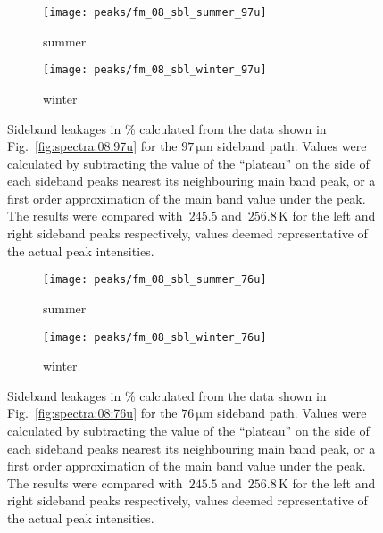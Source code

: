 \begin{figure}[ht]
    \centering
    \begin{subfigure}[b]{0.9545\textwidth}
        \texttt{[image: peaks/fm\_08\_sbl\_summer\_97u]}
        \caption{summer}\label{fig:sbl:08:summer:97u}
    \end{subfigure}
    \begin{subfigure}[b]{0.9545\textwidth}
        \texttt{[image: peaks/fm\_08\_sbl\_winter\_97u]}
        \caption{winter}\label{fig:sbl:08:winter:97u}
    \end{subfigure}
    \caption{Sideband leakages in \% calculated from the data shown in
        Fig.~\ref{fig:spectra:08:97u} for the $97\,\mathrm{\mu m}$ sideband
        path.  Values were calculated by subtracting the value of the
        ``plateau'' on the side of each sideband peaks nearest its
        neighbouring main band peak, or a first order approximation of the
        main band value under the peak.  The results were compared with~$245.5$
        and~$256.8\,\mathrm{K}$ for the left and right sideband peaks
        respectively, values deemed representative of the actual peak
        intensities.
        }\label{fig:sbl:08:97u}
\end{figure}

\begin{figure}[ht]
    \centering
    \begin{subfigure}[b]{0.9545\textwidth}
        \texttt{[image: peaks/fm\_08\_sbl\_summer\_76u]}
        \caption{summer}\label{fig:sbl:08:summer:76u}
    \end{subfigure}
    \begin{subfigure}[b]{0.9545\textwidth}
        \texttt{[image: peaks/fm\_08\_sbl\_winter\_76u]}
        \caption{winter}\label{fig:sbl:08:winter:76u}
    \end{subfigure}
    \caption{Sideband leakages in \% calculated from the data shown in
        Fig.~\ref{fig:spectra:08:76u} for the $76\,\mathrm{\mu m}$ sideband
        path.  Values were calculated by subtracting the value of the
        ``plateau'' on the side of each sideband peaks nearest its
        neighbouring main band peak, or a first order approximation of the
        main band value under the peak.  The results were compared with~$245.5$
        and~$256.8\,\mathrm{K}$ for the left and right sideband peaks
        respectively, values deemed representative of the actual peak
        intensities.
        }\label{fig:sbl:08:76u}
\end{figure}

